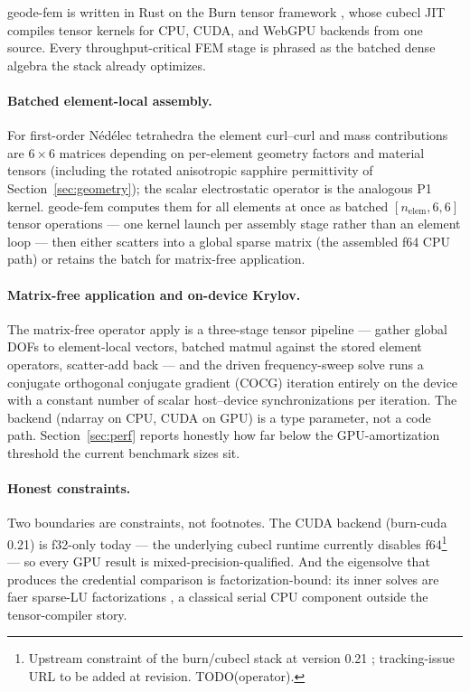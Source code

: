 \documentclass{anvil-paper}
\begin{document}
geode-fem is written in Rust on the Burn tensor framework \citep{burn},
whose cubecl JIT compiles tensor kernels for CPU, CUDA, and WebGPU
backends from one source. Every throughput-critical FEM stage is phrased
as the batched dense algebra the stack already optimizes.

\paragraph{Batched element-local assembly.}
For first-order N\'ed\'elec tetrahedra the element curl--curl and mass
contributions are $6\times 6$ matrices depending on per-element geometry
factors and material tensors (including the rotated anisotropic sapphire
permittivity of Section~\ref{sec:geometry}); the scalar electrostatic
operator is the analogous P1 kernel. geode-fem computes them for all
elements at once as batched $[n_{\mathrm{elem}},6,6]$ tensor operations
--- one kernel launch per assembly stage rather than an element loop ---
then either scatters into a global sparse matrix (the assembled f64 CPU
path) or retains the batch for matrix-free application.

\paragraph{Matrix-free application and on-device Krylov.}
The matrix-free operator apply is a three-stage tensor pipeline ---
gather global DOFs to element-local vectors, batched matmul against the
stored element operators, scatter-add back --- and the driven
frequency-sweep solve runs a conjugate orthogonal conjugate gradient
(COCG) iteration entirely on the device with a constant number of scalar
host--device synchronizations per iteration. The backend (ndarray on CPU,
CUDA on GPU) is a type parameter, not a code path.
Section~\ref{sec:perf} reports honestly how far below the
GPU-amortization threshold the current benchmark sizes sit.

\paragraph{Honest constraints.}
Two boundaries are constraints, not footnotes. The CUDA backend
(burn-cuda 0.21) is f32-only today --- the underlying cubecl runtime
currently disables f64\footnote{Upstream constraint of the burn/cubecl
stack at version 0.21 \citep{burn}; tracking-issue URL to be added at
revision. TODO(operator).} --- so every GPU result is
mixed-precision-qualified. And the eigensolve that produces the
credential comparison is factorization-bound: its inner solves are faer
sparse-LU factorizations \citep{kazdadi2026faer}, a classical serial CPU
component outside the tensor-compiler story.
\end{document}
